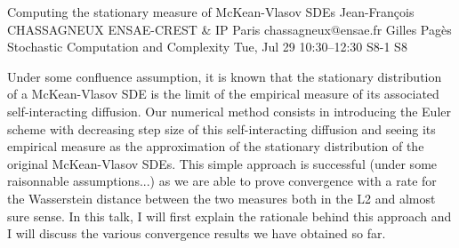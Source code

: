 \begin{talk}
  {Computing the stationary measure of McKean-Vlasov SDEs}%
  {Jean-Fran\c{c}ois CHASSAGNEUX}%
  {ENSAE-CREST \& IP Paris}%
  {chassagneux@ensae.fr}%
  {Gilles Pag\`es}%
  {Stochastic Computation and Complexity}%
  {Tue, Jul 29 10:30–12:30}%
  {S8-1}%
  {S8}%
				
			
Under some confluence assumption, it is known that the stationary distribution of a McKean-Vlasov SDE is the limit of the empirical measure of its associated self-interacting diffusion. 
Our numerical method consists in introducing the Euler scheme with decreasing step size of this self-interacting diffusion and seeing its empirical measure as the approximation of the stationary distribution of the original McKean-Vlasov SDEs.
This simple approach is successful (under some raisonnable assumptions...) as we are able to prove convergence with a rate for the Wasserstein distance between the two measures both in the L2 and almost sure sense. In this talk, I will first explain the rationale behind this approach and  I will discuss the various convergence results we have obtained so far.





\end{talk}

